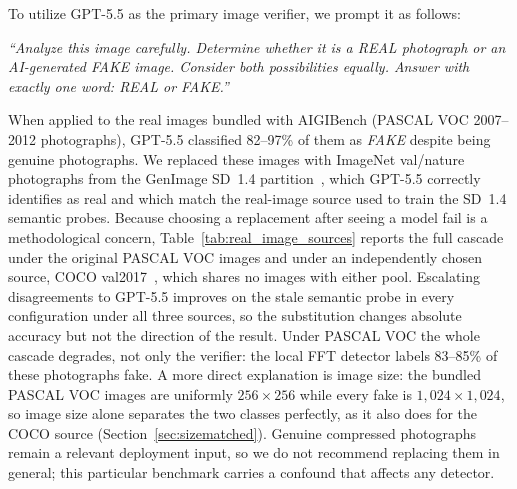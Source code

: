 \documentclass{ieeeaccess}
\begin{document}
To utilize GPT-5.5 as the primary image verifier, we prompt it as follows:

\noindent
\begin{minipage}{\linewidth}
\vspace{10pt}
\itshape
``Analyze this image carefully. Determine whether it is a REAL photograph or an AI-generated FAKE image. Consider both possibilities equally. Answer with exactly one word: REAL or FAKE.''
\vspace{10pt}
\end{minipage}

When applied to the real images bundled with AIGIBench (PASCAL VOC 2007--2012
photographs), GPT-5.5 classified 82--97\% of them as \emph{FAKE} despite being
genuine photographs. We replaced these
images with ImageNet val/nature photographs from the GenImage SD~1.4
partition~\cite{NEURIPS2023_f4d4a021}, which GPT-5.5 correctly identifies as real
and which match the real-image source used to train the SD~1.4 semantic probes.
Because choosing a replacement after seeing a model fail is a methodological concern,
Table~\ref{tab:real_image_sources} reports the full cascade under the original PASCAL VOC
images and under an independently chosen source, COCO val2017~\cite{lin2014microsoft},
which shares no images with either pool. Escalating disagreements to GPT-5.5 improves on
the stale semantic probe in every configuration under all three sources, so the
substitution changes absolute accuracy but not the direction of the result. Under PASCAL
VOC the whole cascade degrades, not only the verifier: the local FFT detector labels
83--85\% of these photographs fake. A more direct explanation is image
size: the bundled PASCAL VOC images are uniformly $256{\times}256$ while every fake is
$1{,}024{\times}1{,}024$, so image size alone separates the two classes perfectly, as it
also does for the COCO source (Section~\ref{sec:sizematched}). Genuine compressed
photographs remain a relevant deployment input, so we do not recommend replacing them in
general; this particular benchmark carries a confound that affects any detector.
\end{document}
